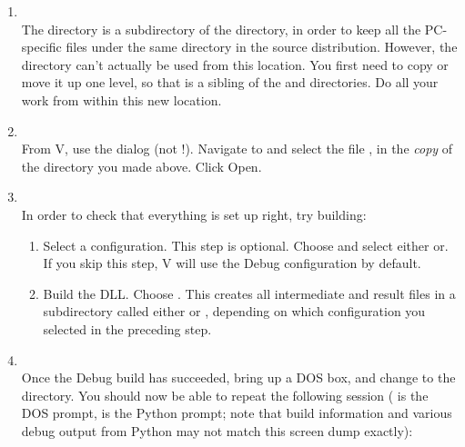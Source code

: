 \begin{enumerate}
  \item
  \\
    The  directory is a subdirectory of the 
    directory, in order to keep all the PC-specific files under the
    same directory in the source distribution.  However, the
     directory can't actually be used from this
    location.  You first need to copy or move it up one level, so that
     is a sibling of the  and 
    directories.  Do all your work from within this new location.

  \item
  \\
    From V\Cpp, use the 
    dialog (not !).  Navigate to and
    select the file , in the \emph{copy} of the
     directory you made above.  Click Open.

  \item
  \\
    In order to check that everything is set up right, try building:

    \begin{enumerate}
      \item
        Select a configuration.  This step is optional.  Choose
         and select either  
        or.  If you skip this step,
        V\Cpp{} will use the Debug configuration by default.

      \item
        Build the DLL.  Choose .  This creates all intermediate and result files in
        a subdirectory called either  or ,
        depending on which configuration you selected in the preceding
        step.
    \end{enumerate}

  \item
  \\
    Once the Debug build has succeeded, bring up a DOS box, and change
    to the  directory.  You
    should now be able to repeat the following session ( is
    the DOS prompt, \code{>>>} is the Python prompt; note that
    build information and various debug output from Python may not
    match this screen dump exactly):


\end{enumerate}
